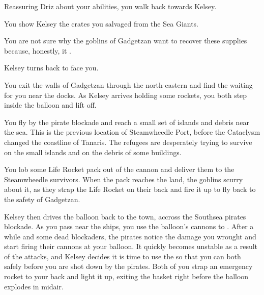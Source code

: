 

Reassuring Driz about your abilities, you walk back towards Kelsey.



You show Kelsey the crates you salvaged from the Sea Giants.


You are not sure why the goblins of Gadgetzan want to recover these supplies because, honestly, it .  %




Kelsey turns back to face you.


You exit the walls of Gadgetzan through the north-eastern and find the  waiting for you near the docks. As Kelsey arrives holding some rockets, you both step inside the balloon and lift off.

You fly by the pirate blockade and reach a small set of islands and debris near the sea. This is the previous location of Steamwheedle Port, before the Cataclysm changed the coastline of Tanaris. The refugees are desperately trying to survive on the small islands and on the debris of some buildings.

You lob some Life Rocket pack out of the cannon and deliver them to the Steamwheedle survivors. When the pack reaches the land, the goblins scurry about it, as they strap the Life Rocket on their back and fire it up to fly back to the safety of Gadgetzan.

Kelsey then drives the balloon back to the town, accross the Southsea pirates blockade. As you pass near the ships, you use the balloon's cannons to . After a while and some dead blockaders, the pirates notice the damage you wrought and start firing their cannons at your balloon. It quickly becomes unstable as a result of the attacks, and Kelsey decides it is time to use the  so that you can both safely  before you are shot down by the pirates. Both of you strap an emergency rocket to your back and light it up, exiting the basket right before the balloon explodes in midair.

